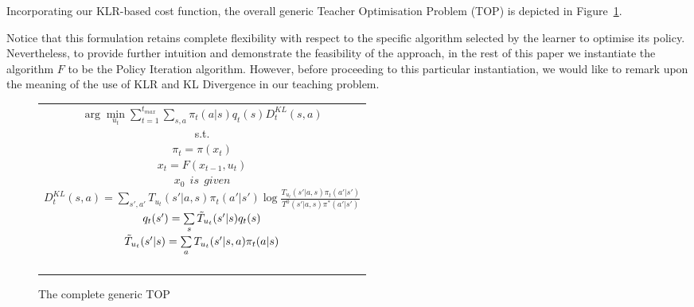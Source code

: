 Incorporating our KLR-based cost function, the overall generic Teacher
Optimisation Problem (TOP) is depicted in Figure~\ref{t_opt}. 

Notice
that this formulation retains complete flexibility with respect to the
specific algorithm selected by the learner to optimise its
policy. Nevertheless, to provide further intuition and demonstrate the
feasibility of the approach, in the rest of this paper we instantiate
the algorithm $F$ to be the Policy Iteration algorithm. However,
before proceeding  to this particular instantiation, we would like to
remark upon the meaning of the use of KLR and KL Divergence in our teaching problem.

\begin{figure}[ht]
\begin{tabular}{|c|} \hline \parbox{3.2 in} {\center 
$\arg\min\limits_{u_t}\sum\limits_{t=1}^{t_{max}}\sum\limits_{s,a}\pi_t(a|s)q_t(s)D^{KL}_t(s,a)$\\
s.t.\\
$\pi_t=\pi(x_t)$\\
$x_t=F(x_{t-1},u_t)$\\
$x_0\ \ \displaystyle{is\ \ given}$\\
$D^{KL}_t(s,a)=\sum\limits_{s',a'}T_{u_t}(s'|a,s)\pi_t(a'|s')\log\frac{T_{u_t}(s'|a,s)\pi_t(a'|s')}{T^0(s'|a,s)\pi^*(a'|s')}$\\
$q_t(s')=\sum\limits_s\Tilde{T}_{u_t}(s'|s)q_t(s)$\\
$\Tilde{T}_{u_t}(s'|s)=\sum\limits_aT_{u_t}(s'|s,a)\pi_t(a|s)$\\\ \\
}\\ \hline \end{tabular}
\caption{\label{t_opt}The complete generic TOP}
\end{figure}

